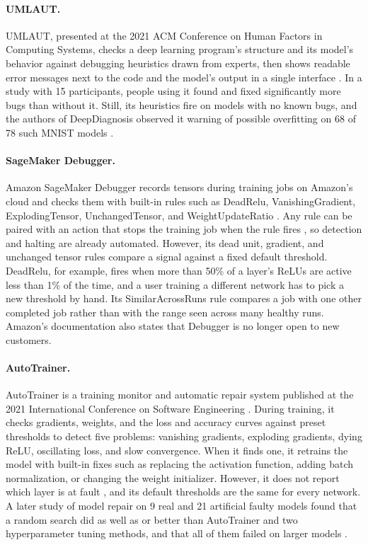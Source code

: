 \paragraph{UMLAUT.} UMLAUT, presented at the 2021 ACM Conference on Human Factors in Computing Systems, checks a deep learning program's structure and its model's behavior against debugging heuristics drawn from experts, then shows readable error messages next to the code and the model's output in a single interface \citep{schoop2021}. In a study with 15 participants, people using it found and fixed significantly more bugs than without it. Still, its heuristics fire on models with no known bugs, and the authors of DeepDiagnosis observed it warning of possible overfitting on 68 of 78 such MNIST models \citep{wardat2022}.

\paragraph{SageMaker Debugger.} Amazon SageMaker Debugger records tensors during training jobs on Amazon's cloud and checks them with built-in rules such as DeadRelu, VanishingGradient, ExplodingTensor, UnchangedTensor, and WeightUpdateRatio \citep{aws_rules}. Any rule can be paired with an action that stops the training job when the rule fires \citep{aws_actions}, so detection and halting are already automated. However, its dead unit, gradient, and unchanged tensor rules compare a signal against a fixed default threshold. DeadRelu, for example, fires when more than 50\% of a layer's ReLUs are active less than 1\% of the time, and a user training a different network has to pick a new threshold by hand. Its SimilarAcrossRuns rule compares a job with one other completed job rather than with the range seen across many healthy runs. Amazon's documentation also states that Debugger is no longer open to new customers.

\paragraph{AutoTrainer.} AutoTrainer is a training monitor and automatic repair system published at the 2021 International Conference on Software Engineering \citep{zhang2021}. During training, it checks gradients, weights, and the loss and accuracy curves against preset thresholds to detect five problems: vanishing gradients, exploding gradients, dying ReLU, oscillating loss, and slow convergence. When it finds one, it retrains the model with built-in fixes such as replacing the activation function, adding batch normalization, or changing the weight initializer. However, it does not report which layer is at fault \citep{wardat2022}, and its default thresholds are the same for every network. A later study of model repair on 9 real and 21 artificial faulty models found that a random search did as well as or better than AutoTrainer and two hyperparameter tuning methods, and that all of them failed on larger models \citep{kim2023}.

